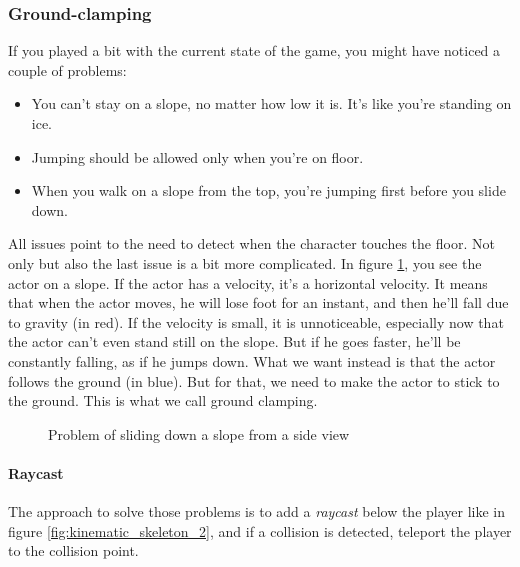 \documentclass[10pt,a4paper]{article}
\begin{document}
\subsubsection{Ground-clamping}
\label{subsec:ground_clamping}
If you played a bit with the current state of the game, you might have noticed a couple of problems:
\begin{itemize}
\item You can't stay on a slope, no matter how low it is. It's like you're standing on ice.
\item Jumping should be allowed only when you're on floor.
\item When you walk on a slope from the top, you're jumping first before you slide down.
\end{itemize}
All issues point to the need to detect when the character touches the floor. Not only but also the last issue is a bit more complicated. In figure \ref{fig:basic_gravity_slope}, you see the actor on a slope. If the actor has a velocity, it's a horizontal velocity. It means that when the actor moves, he will lose foot for an instant, and then he'll fall due to gravity (in red). If the velocity is small, it is unnoticeable, especially now that the actor can't even stand still on the slope. But if he goes faster, he'll be constantly falling, as if he jumps down. What we want instead is that the actor follows the ground (in blue). But for that, we need to make the actor to stick to the ground. This is what we call ground clamping.

\begin{figure}[H]
\centering
{}
\caption{Problem of sliding down a slope from a side view}
\label{fig:basic_gravity_slope}
\end{figure}

\paragraph{Raycast} The approach to solve those problems is to add a \textit{raycast} below the player like in figure \ref{fig:kinematic_skeleton_2}, and if a collision is detected, teleport the player to the collision point.
\end{document}
